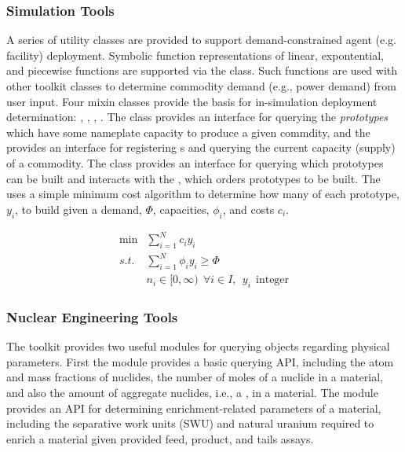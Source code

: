 \subsubsection{Simulation Tools}

A series of utility classes are provided to support demand-constrained agent
(e.g. facility) deployment. Symbolic function representations of linear,
expontential, and piecewise functions are supported via the
 class. Such functions are used with other toolkit
classes to determine commodity demand (e.g., power demand) from user input. Four
mixin classes provide the basis for in-simulation deployment determination:
, , ,
. The  class provides an
interface for querying the \textit{prototypes} which have some nameplate
capacity to produce a given commdity, and the 
provides an interface for registering s and querying
the current capacity (supply) of a commodity. The  class provides
an interface for querying which prototypes can be built and interacts with the
, which orders prototypes to be built. The
 uses a simple minimum cost algorithm to determine how
many of each prototype, $y_i$, to build given a demand, $\Phi$, capacities,
$\phi_i$, and costs $c_i$.

\begin{equation}
\begin{aligned}
 \min & \sum_{i=1}^{N}c_i y_i \\
 s.t. & \sum_{i=1}^{N}\phi_i y_i \ge \Phi \\
      & n_i \in [0,\infty) \:\: \forall i \in I, \:\: y_i \:\: \text{integer} 
\end{aligned}
\end{equation}

\subsubsection{Nuclear Engineering Tools}

The \Cyclus toolkit provides two useful modules for querying 
objects regarding physical parameters. First the  module
provides a basic querying \gls{API}, including the atom and mass fractions of
nuclides, the number of moles of a nuclide in a material, and also the amount of
aggregate nuclides, i.e., a , in a material. The
 module provides an \gls{API} for determining enrichment-related
parameters of a material, including the separative work units (SWU) and natural
uranium required to enrich a material given provided feed, product, and tails
assays.

